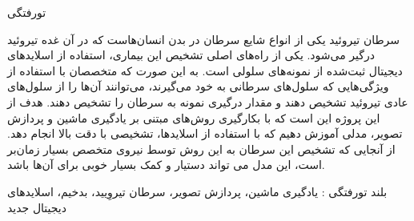 

\pagestyle{empty}

‌تورفتگی

سرطان تیروئید یکی از انواع شایع سرطان در بدن انسان‌هاست که در آن غده تیروئید درگیر می‌شود.
یکی از راه‌های اصلی تشخیص این بیماری، استفاده از اسلاید‌های دیجیتال ثبت‌شده از نمونه‌‌های سلولی است.
به این صورت که متخصصان با استفاده از ویژگی‌هایی که سلول‌های سرطانی به خود می‌گیرند، می‌توانند آن‌ها را از سلول‌های عادی تیروئید تشخیص دهند و مقدار درگیری نمونه به سرطان را تشخیص دهند.
هدف از این پروژه این است که با بکارگیری روش‌های مبتنی بر یادگیری ماشین و پردازش تصویر، مدلی آموزش دهیم که با استفاده از اسلاید‌ها، تشخیصی با دقت بالا انجام دهد. از آنجایی که تشخیص این سرطان به این روش توسط نیروی متخصص بسیار زمان‌بر است، این مدل می تواند دستیار و کمک بسیار خوبی برای آن‌ها باشد.

‌بلند
‌تورفتگی :
یادگیری ماشین، پردازش تصویر، سرطان تیروِیید، بدخیم، اسلاید‌های دیجیتال
‌جدید
